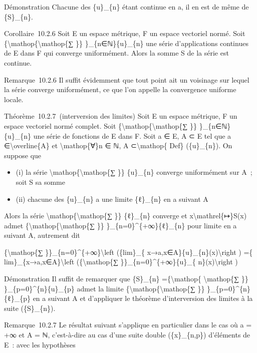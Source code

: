 \documentclass[]{article}
\begin{document}
Démonstration Chacune des \{u\}\_\{n\} étant continue en a, il en est de
même de \{S\}\_\{n\}.

Corollaire~10.2.6 Soit E un espace métrique, F un espace vectoriel
normé. Soit \{\textbackslash{}mathop\{\textbackslash{}mathop\{∑ \}\}
\}\_\{n∈ℕ\}\{u\}\_\{n\} une série d'applications continues de E dans F
qui converge uniformément. Alors la somme S de la série est continue.

Remarque~10.2.6 Il suffit évidemment que tout point ait un voisinage sur
lequel la série converge uniformément, ce que l'on appelle la
convergence uniforme locale.

Théorème~10.2.7~(interversion des limites) Soit E un espace métrique, F
un espace vectoriel normé complet. Soit
\{\textbackslash{}mathop\{\textbackslash{}mathop\{∑ \}\}
\}\_\{n∈ℕ\}\{u\}\_\{n\} une série de fonctions de E dans F. Soit a ∈ E,
A ⊂ E tel que a ∈\textbackslash{}overline\{A\} et
\textbackslash{}mathop\{∀\}n ∈ ℕ, A ⊂\textbackslash{}mathop\{ Def\}
(\{u\}\_\{n\}). On suppose que

\begin{itemize}
\itemsep1pt\parskip0pt
\item
  (i) la série \textbackslash{}mathop\{\textbackslash{}mathop\{∑ \}\}
  \{u\}\_\{n\} converge uniformément sur A~; soit S sa somme
\item
  (ii) chacune des \{u\}\_\{n\} a une limite \{ℓ\}\_\{n\} en a suivant A
\end{itemize}

Alors la série \textbackslash{}mathop\{\textbackslash{}mathop\{∑ \}\}
\{ℓ\}\_\{n\} converge et x\textbackslash{}mathrel\{↦\}S(x) admet
\{\textbackslash{}mathop\{\textbackslash{}mathop\{∑ \}\}
\}\_\{n=0\}\^{}\{+∞\}\{ℓ\}\_\{n\} pour limite en a suivant A, autrement
dit

\{\textbackslash{}mathop\{∑ \}\}\_\{n=0\}\^{}\{+∞\}\textbackslash{}left
(\{lim\}\_\{ x→a,x∈A\}\{u\}\_\{n\}(x)\textbackslash{}right ) =\{
lim\}\_\{x→a,x∈A\}\textbackslash{}left (\{\textbackslash{}mathop\{∑
\}\}\_\{n=0\}\^{}\{+∞\}\{u\}\_\{ n\}(x)\textbackslash{}right )

Démonstration Il suffit de remarquer que \{S\}\_\{n\}
=\{\textbackslash{}mathop\{ \textbackslash{}mathop\{∑ \}\}
\}\_\{p=0\}\^{}\{n\}\{u\}\_\{p\} admet la limite
\{\textbackslash{}mathop\{\textbackslash{}mathop\{∑ \}\}
\}\_\{p=0\}\^{}\{n\}\{ℓ\}\_\{p\} en a suivant A et d'appliquer le
théorème d'interversion des limites à la suite (\{S\}\_\{n\}).

Remarque~10.2.7 Le résultat suivant s'applique en particulier dans le
cas où a = +∞ et A = ℕ, c'est-à-dire au cas d'une suite double
(\{x\}\_\{n,p\}) d'éléments de E~: avec les hypothèses
\end{document}

